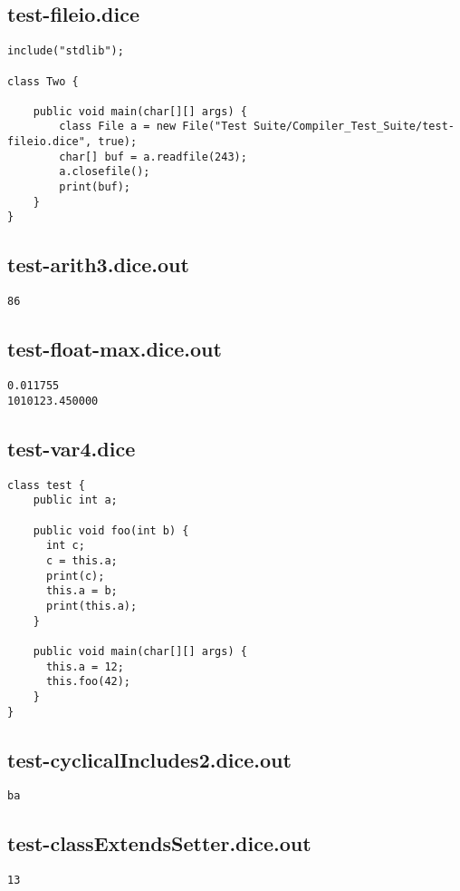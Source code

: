 \subsection{test-fileio.dice}
\begin{verbatim}
include("stdlib");

class Two {

	public void main(char[][] args) {
        class File a = new File("Test Suite/Compiler_Test_Suite/test-fileio.dice", true);
        char[] buf = a.readfile(243);
        a.closefile();
        print(buf);
	}
}

\end{verbatim}
\pagebreak
\subsection{test-arith3.dice.out}
\begin{verbatim}
86
\end{verbatim}
\pagebreak
\subsection{test-float-max.dice.out}
\begin{verbatim}
0.011755
1010123.450000
\end{verbatim}
\pagebreak
\subsection{test-var4.dice}
\begin{verbatim}
class test {
	public int a;

	public void foo(int b) {
	  int c;
	  c = this.a;
	  print(c);
	  this.a = b;
	  print(this.a);
	}

	public void main(char[][] args) {
	  this.a = 12;
	  this.foo(42);
	}
}
\end{verbatim}
\pagebreak
\subsection{test-cyclicalIncludes2.dice.out}
\begin{verbatim}
ba
\end{verbatim}
\pagebreak
\subsection{test-classExtendsSetter.dice.out}
\begin{verbatim}
13
\end{verbatim}
\pagebreak

